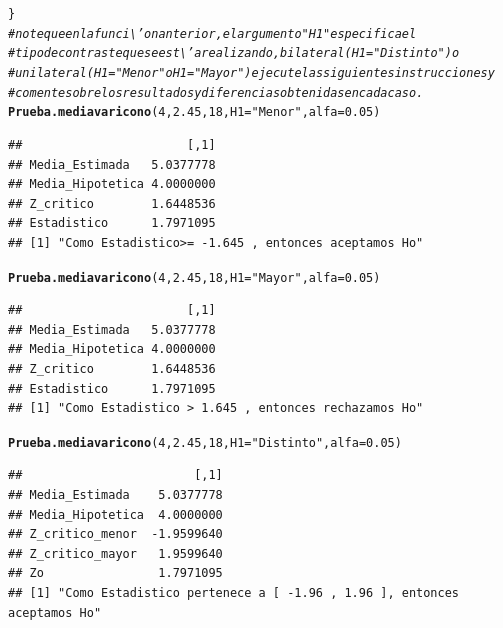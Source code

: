 \documentclass[12pt,letterpaper]{article}\usepackage[]{graphicx}\usepackage[]{color}
\makeatletter
\newcommand{\hlnum}[1]{\textcolor[rgb]{0.686,0.059,0.569}{#1}}%
\newcommand{\hlstr}[1]{\textcolor[rgb]{0.192,0.494,0.8}{#1}}%
\newcommand{\hlcom}[1]{\textcolor[rgb]{0.678,0.584,0.686}{\textit{#1}}}%
\newcommand{\hlstd}[1]{\textcolor[rgb]{0.345,0.345,0.345}{#1}}%
\newcommand{\hlkwc}[1]{\textcolor[rgb]{0.333,0.667,0.333}{#1}}%
\newcommand{\hlkwd}[1]{\textcolor[rgb]{0.737,0.353,0.396}{\textbf{#1}}}%
\newenvironment{kframe}{%
 \def\at@end@of@kframe{}%
 \ifinner\ifhmode%
  \def\at@end@of@kframe{\end{minipage}}%
  \begin{minipage}{\columnwidth}%
 \fi\fi%
 \def\FrameCommand##1{\hskip\@totalleftmargin \hskip-\fboxsep
 \colorbox{shadecolor}{##1}\hskip-\fboxsep
     \hskip-\linewidth \hskip-\@totalleftmargin \hskip\columnwidth}%
 \MakeFramed {\advance\hsize-\width
   \@totalleftmargin\z@ \linewidth\hsize
   \@setminipage}}%
 {\par\unskip\endMakeFramed%
 \at@end@of@kframe}
\newenvironment{knitrout}{}{} %
\makeatother
\begin{document}
\begin{knitrout}
\begin{kframe}
\begin{alltt}
\hlstd{\}}
\hlcom{# note que en la funci\textbackslash{}'on anterior, el argumento "H1" especifica el }
\hlcom{# tipo de contraste que se est\textbackslash{}'a realizando, bilateral (H1= "Distinto") o }
\hlcom{# unilateral (H1= "Menor" o H1= "Mayor") ejecute las siguientes instrucciones y }
\hlcom{# comente sobre los resultados y diferencias obtenidas en cada caso. }
\hlkwd{Prueba.mediavaricono} \hlstd{(}\hlnum{4}\hlstd{,} \hlnum{2.45}\hlstd{,} \hlnum{18}\hlstd{,} \hlkwc{H1}\hlstd{=}\hlstr{"Menor"}\hlstd{,} \hlkwc{alfa}\hlstd{=}\hlnum{0.05}\hlstd{)}
\end{alltt}
\begin{verbatim}
##                       [,1]
## Media_Estimada   5.0377778
## Media_Hipotetica 4.0000000
## Z_critico        1.6448536
## Estadistico      1.7971095
## [1] "Como Estadistico>= -1.645 , entonces aceptamos Ho"
\end{verbatim}
\begin{alltt}
\hlkwd{Prueba.mediavaricono} \hlstd{(}\hlnum{4}\hlstd{,} \hlnum{2.45}\hlstd{,} \hlnum{18}\hlstd{,} \hlkwc{H1}\hlstd{=}\hlstr{"Mayor"}\hlstd{,} \hlkwc{alfa}\hlstd{=}\hlnum{0.05}\hlstd{)}
\end{alltt}
\begin{verbatim}
##                       [,1]
## Media_Estimada   5.0377778
## Media_Hipotetica 4.0000000
## Z_critico        1.6448536
## Estadistico      1.7971095
## [1] "Como Estadistico > 1.645 , entonces rechazamos Ho"
\end{verbatim}
\begin{alltt}
\hlkwd{Prueba.mediavaricono} \hlstd{(}\hlnum{4}\hlstd{,} \hlnum{2.45}\hlstd{,} \hlnum{18}\hlstd{,} \hlkwc{H1}\hlstd{=}\hlstr{"Distinto"}\hlstd{,} \hlkwc{alfa}\hlstd{=}\hlnum{0.05}\hlstd{)}
\end{alltt}
\begin{verbatim}
##                        [,1]
## Media_Estimada    5.0377778
## Media_Hipotetica  4.0000000
## Z_critico_menor  -1.9599640
## Z_critico_mayor   1.9599640
## Zo                1.7971095
## [1] "Como Estadistico pertenece a [ -1.96 , 1.96 ], entonces aceptamos Ho"
\end{verbatim}
\end{kframe}
\end{knitrout}


 
\end{document}
